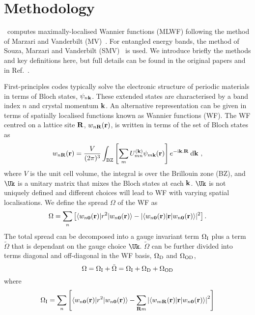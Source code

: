 \chapter{Methodology}\label{sec:method}
\wannier\ computes maximally-localised Wannier functions (MLWF)
following the method of Marzari and Vanderbilt
(MV)~\cite{marzari-prb97}.  For entangled energy bands, the method of
Souza, Marzari and Vanderbilt (SMV)~\cite{souza-prb01} is used. We
introduce briefly the methods and key definitions here, but full
details can be found in the original papers and in
Ref.~\cite{mostofi-cpc08}.

First-principles codes typically solve the electronic structure of
periodic materials in terms of Bloch states, $\psi_{n{\bf k}}$. 
These extended states are characterised by a band index $n$ and crystal
momentum ${\bf k}$. An alternative representation can be given in terms
of spatially localised functions known as Wannier functions (WF). The WF 
centred on a lattice site ${\bf R}$, $w_{n{\bf R}}({\bf r})$, 
is written in terms of the set of Bloch states as
\begin{equation}
w_{n{\bf R}}({\bf r})=\frac{V}{(2\pi)^3}\int_{\mathrm{BZ}}
\left[\sum_{m} U^{({\bf k})}_{mn} \psi_{m{\bf k}}({\bf
    r})\right]e^{-\mathrm{i}{\bf k}.{\bf R}} \:\mathrm{d}{\bf k} \ , 
\end{equation}
where $V$ is the unit cell volume, the integral is over the Brillouin
zone (BZ), and $\Uk$ is a unitary matrix that mixes the Bloch 
states at each ${\bf k}$. $\Uk$ is not uniquely defined and different
choices will lead to WF with varying spatial localisations. We define
the spread $\Omega$ of the WF as 
\begin{equation}
\Omega=\sum_n \left[\langle w_{n{\bf 0}}({\bf r})| r^2 | w_{n{\bf
      0}}({\bf r}) \rangle - | \langle w_{n{\bf 0}}({\bf r})| {\bf r}
      | w_{n{\bf 0}}({\bf r}) \rangle |^2 \right].
\end{equation}
The total spread can be decomposed into a gauge invariant term
$\Omega_{\rm I}$ plus a term ${\tilde \Omega}$ that is dependant on the gauge
choice $\Uk$. ${\tilde \Omega}$ can
be further divided into terms diagonal and off-diagonal in the WF basis,
$\Omega_{\rm D}$ and $\Omega_{\rm OD}$,
\begin{equation}
\Omega=\Omega_{\rm I}+{\tilde \Omega}=\Omega_{\rm I}+\Omega_{\rm
  D}+\Omega_{\rm OD} 
\end{equation}
where
\begin{equation}
\Omega_{{\rm I}}=\sum_n \left[\langle w_{n{\bf 0}}({\bf r})| r^2 | w_{n{\bf
      0}}({\bf r}) \rangle - \sum_{{\bf R}m} \left| \langle w_{m{\bf
      R}}({\bf r})| {\bf r} | w_{n{\bf 0}}({\bf r}) \rangle \right| ^2
      \right] 
\end{equation}
